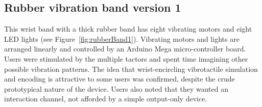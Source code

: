\documentclass{chi-ext}
\begin{document}
\subsection{Rubber vibration band version 1}
This wrist band with a thick rubber band has eight vibrating motors and eight LED lights (see Figure~\ref{fig:rubberBand1}). Vibrating motors and lights are arranged linearly and controlled by an Arduino Mega micro-controller board. Users were stimulated by the multiple tactors and spent time imagining other possible vibration patterns. The idea that wrist-encircling vibrotactile simulation and encoding is attractive to some users was confirmed, despite the crude prototypical nature of the device. Users also noted that they wanted an interaction channel, not afforded by a simple output-only device. 


\end{document}

